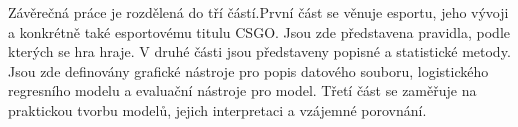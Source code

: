 Závěrečná práce je rozdělená do tří částí.První část se věnuje esportu, jeho vývoji a konkrétně také esportovému titulu \ac{CSGO}. Jsou zde představena pravidla, podle kterých se
hra hraje. V druhé části jsou představeny popisné a statistické metody. Jsou zde definovány grafické nástroje pro popis datového souboru, logistického
regresního modelu a evaluační nástroje pro model. Třetí část se zaměřuje na praktickou tvorbu modelů, jejich interpretaci a vzájemné porovnání.
